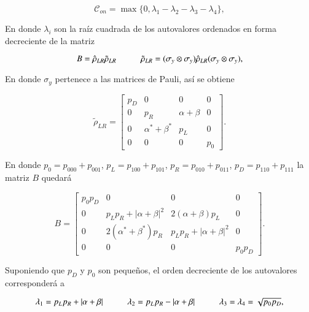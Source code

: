 \begin{appendixs}
\begin{equation*}
    \mathcal{C}_{on} = \max \{ 0,\lambda_{1} - \lambda_{2} - \lambda_{3} - \lambda_{4} \},
\end{equation*}

En donde $\lambda_{i}$ son la raíz cuadrada de los autovalores ordenados en forma decreciente de la matriz

\begin{equation*}
    B = \hat{\rho}_{LR} \tilde{\rho}_{LR} \hspace{10mm} \tilde{\rho}_{LR} = (\sigma_{y} \otimes \sigma_{y}) \hat{\rho}_{LR} (\sigma_{y} \otimes \sigma_{y}),
\end{equation*}

En donde $\sigma_{y}$ pertenece a las matrices de Pauli, así se obtiene

\begin{equation*}
    \tilde{\rho}_{LR} = 
    \begin{bmatrix}
        p_{D} & 0 & 0 & 0  \\
        0 & p_{R} & \alpha + \beta & 0  \\
        0 & \alpha^{*} +\beta^{*} & p_{L} & 0  \\
        0 & 0 & 0 & p_{0} 
        \end{bmatrix}.
\end{equation*}

En donde $p_{0}=p_{000}+p_{001}$, $p_{L}=p_{100} + p_{101}$, $p_{R}=p_{010}+p_{011}$, $p_{D}=p_{110}+p_{111}$ la matriz $B$ quedará

\begin{equation*}
    B = 
    \begin{bmatrix}
        p_{0}p_{D} & 0 & 0 & 0  \\
        0 & p_{L}p_{R}+|\alpha+\beta|^{2} & 2(\alpha + \beta)p_{L} & 0  \\
        0 & 2(\alpha^{*} +\beta^{*})p_{R} & p_{L}p_{R}+|\alpha+\beta|^{2}  & 0  \\
        0 & 0 & 0 & p_{0}p_{D}
        \end{bmatrix}.
\end{equation*}

Suponiendo que $p_{D}$ y $p_{0}$ son pequeños, el orden decreciente de los autovalores corresponderá a

\begin{equation*}
    \lambda_{1} = p_{L}p_{R} + |\alpha + \beta| \hspace{10mm}  \lambda_{2} = p_{L}p_{R} - |\alpha + \beta| \hspace{10mm} \lambda_{3}=\lambda_{4} = \sqrt{p_{0}p_{D}},
\end{equation*}


\end{appendixs}

